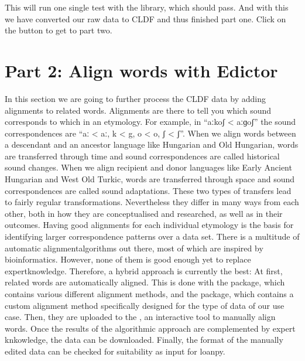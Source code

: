 \documentclass[letterpaper,10pt,english]{sphinxmanual}
\begin{document}
{{{{\sphinxAtStartPar
This will run one single test with the
 library, which should pass.
And with this we have converted our raw data to CLDF and thus finished part
one. Click on the \sphinxhyphen{}button to get to part two.

\sphinxstepscope


\chapter{Part 2: Align words with Edictor}
\label{\detokenize{mkedictor:part-2-align-words-with-edictor}}\label{\detokenize{mkedictor::doc}}
\sphinxAtStartPar
In this section we are going to further process the CLDF data by adding
alignments to related words. Alignments are there to tell you which sound
corresponds to which in an etymology. For example, in “aːkoʃ \textless{} aːɡoʃ” the
sound correspondences are “aː \textless{} aː, k \textless{} g, o \textless{} o, ʃ \textless{} ʃ”. When we align words
between a descendant and an ancestor language like Hungarian and Old
Hungarian, words are transferred through time and sound correspondences are
called historical sound changes. When we align recipient and donor languages
like Early Ancient Hungarian and West Old Turkic, words are transferred
through space and sound correspondences are called sound adaptations.
These two types of transfers lead to fairly regular transformations.
Nevertheless they differ in many ways from each other, both in how they are
conceptualised and researched, as well as in their outcomes. Having good
alignments for each individual etymology is the basis for identifying
larger correspondence patterns over a data set. There is a multitude of
automatic alignment\sphinxhyphen{}algorithms out there, most of which are inspired by
bioinformatics. However, none of them is good enough yet to replace
expert\sphinxhyphen{}knowledge. Therefore, a hybrid approach is currently the best:
At first, related words are automatically aligned. This is done with the
 package, which contains various different
alignment methods, and the 
package, which contains a custom alignment method specifically designed
for the type of data of our use case. Then, they are uploaded to the
, an interactive tool to manually
align words. Once the results of the algorithmic approach are complemented
by expert knkowledge, the data can be downloaded. Finally, the format of
the manually edited data can be checked for suitability as input for
loanpy.

}}}}
\end{document}
